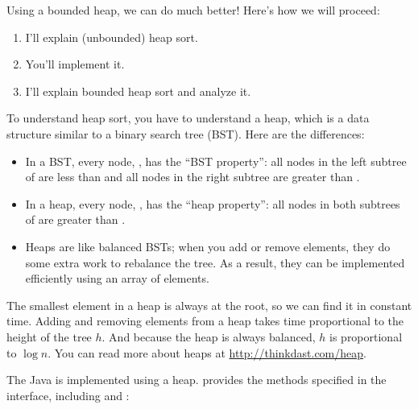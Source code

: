 \documentclass[12pt]{book}
\theoremstyle{exercise}
\begin{document}

Using a bounded heap, we can do much better! Here's how we will
proceed:

\begin{enumerate}

\item
  I'll explain (unbounded) heap sort.

\item
  You'll implement it.

\item
  I'll explain bounded heap sort and analyze it.

\end{enumerate}


To understand heap sort, you have to understand a heap, which is a data
structure similar to a binary search tree (BST). Here are the differences:

\begin{itemize}

\item
  In a BST, every node, , has the ``BST property'': all nodes
  in the left subtree of  are less than  and all
  nodes in the right subtree are greater than .

\item
  In a heap, every node, , has the ``heap property'': all
  nodes in both subtrees of  are greater than .

\item
  Heaps are like balanced BSTs; when you add or remove elements, they
  do some extra work to rebalance the tree.  As a result, they can
  be implemented efficiently using an array of elements.

\end{itemize}

The smallest element in a heap is always at the root, so we can find
it in constant time. Adding and removing elements from a heap takes
time proportional to the height of the tree $h$. And because the heap
is always balanced, $h$ is proportional to $\log n$.  You can read
more about heaps at \url{http://thinkdast.com/heap}.


The Java  is implemented using a heap.
 provides the methods specified in the
 interface, including  and :
\end{document}
